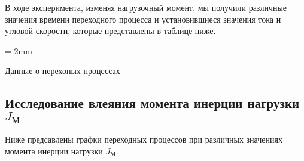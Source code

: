 \documentclass[a4paper, 12pt]{article}
\begin{document}
\newpage
В ходе эксперимента, изменяя нагрузочный момент, мы получили различные значения времени переходного процесса и установившиеся значения тока и угловой скорости, которые представлены в таблице ниже.

\begin{table}[h!]
	\tabulinesep = 2mm
	\centering
	\begin{threeparttable}
        \caption{Данные о перехоных процессах}
 	\end{threeparttable}
\end{table}

\newpage
\begin{center}
\section{Исследование влеяния момента инерции нагрузки $J_\text{М}$}
\end{center}
\par Ниже предсавлены графки переходных процессов при различных значениях момента инерции нагрузки $J_\text{М}$.
\end{document}
